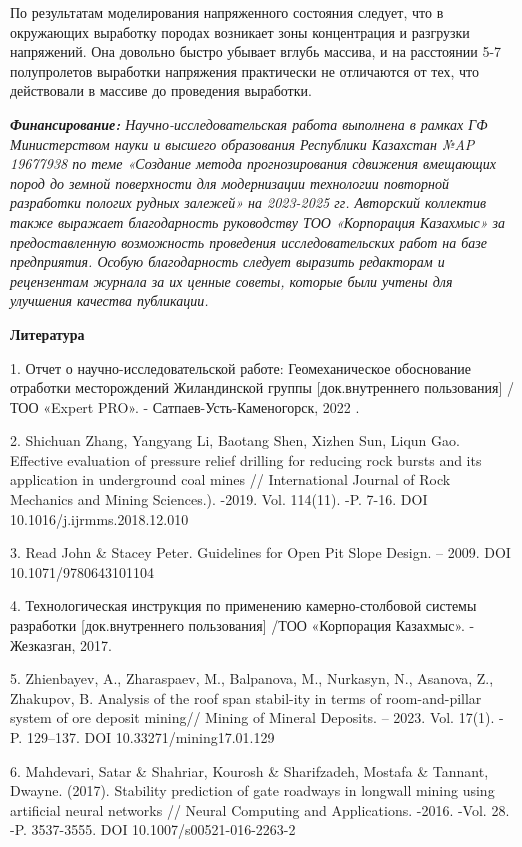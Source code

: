 По результатам моделирования напряженного состояния следует, что в
окружающих выработку породах возникает зоны концентрация и разгрузки
напряжений. Она довольно быстро убывает вглубь массива, и на расстоянии
5-7 полупролетов выработки напряжения практически не отличаются от тех,
что действовали в массиве до проведения выработки.

\emph{{\bfseries Финансирование:} Научно-исследовательская работа выполнена
в рамках ГФ Министерством науки и высшего образования Республики
Казахстан №AP 19677938 по теме «Создание метода прогнозирования
сдвижения вмещающих пород до земной поверхности для модернизации
технологии повторной разработки пологих рудных залежей» на 2023-2025 гг.
Авторский коллектив также выражает благодарность руководству ТОО
«Корпорация Казахмыс» за предоставленную возможность проведения
исследовательских работ на базе предприятия. Особую благодарность
следует выразить редакторам и рецензентам журнала за их ценные советы,
которые были учтены для улучшения качества публикации.}

{\bfseries Литература}

1. Отчет о научно-исследовательской работе: Геомеханическое обоснование
отработки месторождений Жиландинской группы {[}док.внутреннего
пользования{]} / ТОО «Expert PRO». - Сатпаев-Усть-Каменогорск, 2022 .

2. Shichuan Zhang, Yangyang Li, Baotang Shen, Xizhen Sun, Liqun Gao.
Effective evaluation of pressure relief drilling for reducing rock
bursts and its application in underground coal mines // International
Journal of Rock Mechanics and Mining Sciences.). -2019. Vol. 114(11).
-P. 7-16. DOI 10.1016/j.ijrmms.2018.12.010

3. Read John \& Stacey Peter. Guidelines for Open Pit Slope Design. --
2009. DOI 10.1071/9780643101104

4. Технологическая инструкция по применению камерно-столбовой системы
разработки {[}док.внутреннего пользования{]} /ТОО «Корпорация Казахмыс».
- Жезказган, 2017.

5. Zhienbayev, A., Zharaspaev, M., Balpanova, M., Nurkasyn, N., Asanova,
Z., Zhakupov, B. Analysis of the roof span stabil-ity in terms of
room-and-pillar system of ore deposit mining// Mining of Mineral
Deposits. -- 2023. Vol. 17(1). - P. 129--137. DOI
10.33271/mining17.01.129

6. Mahdevari, Satar \& Shahriar, Kourosh \& Sharifzadeh, Mostafa \&
Tannant, Dwayne. (2017). Stability prediction of gate roadways in
longwall mining using artificial neural networks // Neural Computing and
Applications. -2016. -Vol. 28. -P. 3537-3555. DOI
10.1007/s00521-016-2263-2

